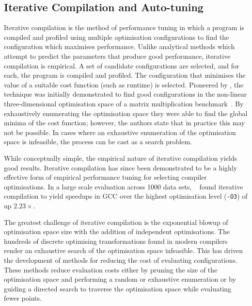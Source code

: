 \subsection{Iterative Compilation and Auto-tuning}

Iterative compilation is the method of performance tuning in which a program is compiled and profiled using multiple optimisation configurations to find the configuration which maximises performance. Unlike analytical methods which attempt to predict the parameters that produce good performance, iterative compilation is empirical. A set of candidate configurations are selected, and for each, the program is compiled and profiled. The configuration that minimises the value of a suitable cost function (such as runtime) is selected. Pioneered by \citeauthor{Bodin1998}, the technique was initially demonstrated to find good configurations in the non-linear three-dimensional optimisation space of a matrix multiplication benchmark~\cite{Bodin1998}. By exhaustively enumerating the optimisation space they were able to find the global minima of the cost function; however, the authors state that in practice this may not be possible. In cases where an exhaustive enumeration of the optimisation space is infeasible, the process can be cast as a search problem.

While conceptually simple, the empirical nature of iterative compilation yields good results. Iterative compilation has since been demonstrated to be a highly effective form of empirical performance tuning for selecting compiler optimisations.
In a large scale evaluation across 1000 data sets, \citeauthor{Chen2010}~\cite{Chen2010} found iterative compilation to yield speedups in GCC over the highest optimisation level (\texttt{-O3}) of up $2.23\times$.

The greatest challenge of iterative compilation is the exponential blowup of optimisation space size with the addition of independent optimisations. The hundreds of discrete optimising transformations found in modern compilers render an exhaustive search of the optimisation space infeasible. This has driven the development of methods for reducing the cost of evaluating configurations. These methods reduce evaluation costs either by pruning the size of the optimisation space and performing a random or exhaustive enumeration or by guiding a directed search to traverse the optimisation space while evaluating fewer points.


